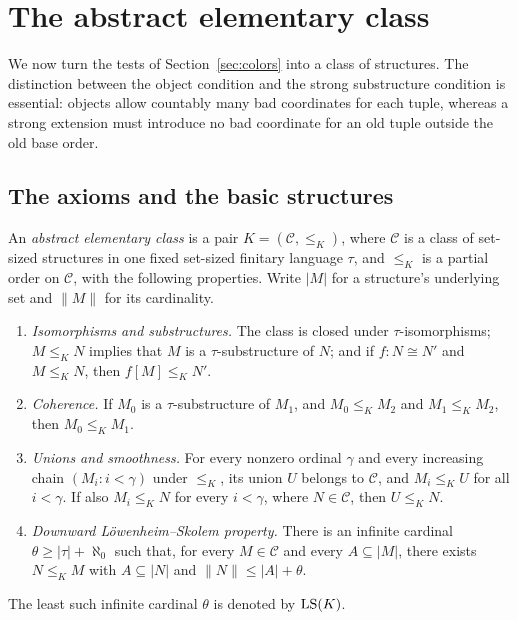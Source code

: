 \section{The abstract elementary class}\label{sec:aec}

We now turn the tests of Section~\ref{sec:colors} into a class of
structures.  The distinction between the object condition and the strong
substructure condition is essential: objects allow countably many bad
coordinates for each tuple, whereas a strong extension must introduce no
bad coordinate for an old tuple outside the old base order.

\subsection{The axioms and the basic structures}

\begin{definition}\label{aec:definition}
An \emph{abstract elementary class} is a pair
\(K=(\mathcal C,\le_K)\), where \(\mathcal C\) is a class of set-sized
structures in one fixed set-sized finitary language \(\tau\), and
\(\le_K\) is a partial order on \(\mathcal C\), with the following
properties.  Write \(|M|\) for a structure's underlying set and
\(\|M\|\) for its cardinality.
\begin{enumerate}[label=\textup{(\arabic*)}]
\item \emph{Isomorphisms and substructures.}
The class is closed under \(\tau\)-isomorphisms; \(M\le_K N\) implies
that \(M\) is a \(\tau\)-substructure of \(N\); and if
\(f:N\cong N'\) and \(M\le_K N\), then \(f[M]\le_K N'\).
\item \emph{Coherence.}
If \(M_0\) is a \(\tau\)-substructure of \(M_1\), and
\(M_0\le_K M_2\) and \(M_1\le_K M_2\), then \(M_0\le_K M_1\).
\item \emph{Unions and smoothness.}
For every nonzero ordinal \(\gamma\) and every increasing chain
\((M_i:i<\gamma)\) under \(\le_K\), its union \(U\) belongs to
\(\mathcal C\), and \(M_i\le_K U\) for all \(i<\gamma\).
If also \(M_i\le_K N\) for every \(i<\gamma\), where
\(N\in\mathcal C\), then \(U\le_K N\).
\item \emph{Downward L\"owenheim--Skolem property.}
There is an infinite cardinal
\(\theta\ge|\tau|+\aleph_0\) such that, for every \(M\in\mathcal C\)
and every \(A\subseteq |M|\), there exists \(N\le_K M\) with
\(A\subseteq |N|\) and \(\|N\|\le |A|+\theta\).
\end{enumerate}
The least such infinite cardinal \(\theta\) is denoted by \(\operatorname{LS}(K)\).
\end{definition}

